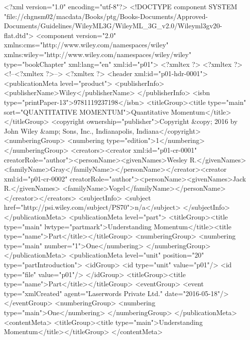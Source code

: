 \def\xmlfile{p01.tml}

<?xml version="1.0" encoding="utf-8"?>
<!DOCTYPE component SYSTEM "file://chgnsm02/macdata/Books/ptg/Books-Documents/Approved-Documents/Guidelines/WileyML3G/WileyML_3G_v2.0/Wileyml3gv20-flat.dtd">
<component version="2.0" xmlns:cms="http://www.wiley.com/namespaces/wiley" xmlns:wiley="http://www.wiley.com/namespaces/wiley/wiley" type="bookChapter" xml:lang="en" xml:id="p01">
<?xmltex ?>
<?xmltex \pgtag{\setcounter{part}{0}\setcounter{page}{1}}?>
<!--<?xmltex \pgtag{\topreviewchk}?>-->
<?xmltex ?>
<header xml:id="p01-hdr-0001">
<publicationMeta level="product">
<publisherInfo>
<publisherName>Wiley</publisherName>
</publisherInfo>
<isbn type="printPaper-13">9781119237198</isbn>
<titleGroup><title type="main" sort="QUANTITATIVE MOMENTUM">Quantitative Momentum</title></titleGroup>
<copyright ownership="publisher">Copyright &copy; 2016 by John Wiley &amp; Sons, Inc., Indianapolis, Indiana</copyright>
<numberingGroup>
<numbering type="edition">1</numbering>
</numberingGroup>
<creators><creator xml:id="p01-cr-0001" creatorRole="author"><personName><givenNames>Wesley R.</givenNames> <familyName>Gray</familyName></personName></creator><creator xml:id="p01-cr-0002" creatorRole="author"><personName><givenNames>Jack R.</givenNames> <familyName>Vogel</familyName></personName></creator></creators>
<subjectInfo>
<subject href="http://psi.wiley.com/subject/PS70">n/a</subject>
</subjectInfo>
</publicationMeta>
<publicationMeta level="part">
<titleGroup><title type="main" lwtype="partmark">Understanding Momentum</title><title type="name">Part</title></titleGroup>
<numberingGroup>
<numbering type="main" number="1">One</numbering>
</numberingGroup>
</publicationMeta>
<publicationMeta level="unit" position="20" type="partIntroduction">
<idGroup>
<id type="unit" value="p01"/>
<id type="file" value="p01"/>
</idGroup>
<titleGroup><title type="name">Part</title></titleGroup>
<eventGroup>
<event type="xmlCreated" agent="Laserwords Private Ltd." date="2016-05-18"/>
</eventGroup>
<numberingGroup>
<numbering type="main">One</numbering>
</numberingGroup>
</publicationMeta>
<contentMeta>
<titleGroup><title type="main">Understanding Momentum</title></titleGroup>
</contentMeta>
